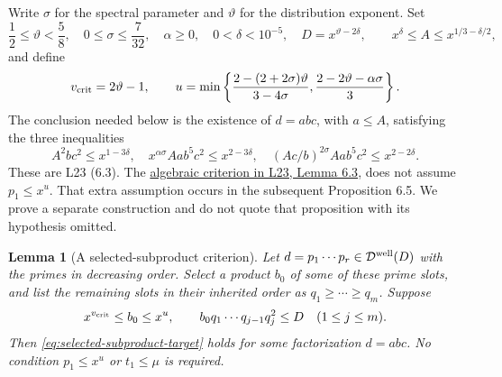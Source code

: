 \documentclass[11pt]{article}
\newtheorem{lemma}[theorem]{Lemma}
\begin{document}
Write $\sigma$ for the spectral parameter and $\vartheta$ for the
distribution exponent.  Set
\[
 \frac12\le\vartheta<\frac58,\quad 0\le\sigma\le\frac7{32},\quad
 \alpha\ge0,\quad 0<\delta<10^{-5},\quad D=x^{\vartheta-2\delta},
 \qquad x^\delta\le A\le x^{1/3-\delta/2},
\]
and define
\[
 v_{\rm crit}=2\vartheta-1,\qquad
 u=\min\left\{
 \frac{2-(2+2\sigma)\vartheta}{3-4\sigma},
 \frac{2-2\vartheta-\alpha\sigma}{3}\right\}.
\]
The conclusion needed below is the existence of $d=abc$, with $a\le A$,
satisfying the three inequalities
\begin{equation}\label{eq:selected-subproduct-target}
 A^2bc^2\le x^{1-3\delta},\quad
 x^{\alpha\sigma}Aab^5c^2\le x^{2-3\delta},\quad
 (Ac/b)^{2\sigma}Aab^5c^2\le x^{2-2\delta}.
\end{equation}
These are L23 (6.3).  The
\href{https://arxiv.org/html/2309.08522v1}
{algebraic criterion in L23, Lemma 6.3}, does not assume
$p_1\le x^u$.  That extra assumption occurs in the subsequent
Proposition 6.5.  We prove a separate construction and do not quote
that proposition with its hypothesis omitted.

\begin{lemma}[A selected-subproduct criterion]
\label{lem:selected-subproduct-factorization}
Let $d=p_1\cdots p_r\in\mathcal D^{\rm well}(D)$ with the primes
in decreasing order.  Select a product $b_0$ of some of these prime
slots, and list the remaining slots in their inherited order as
$q_1\ge\cdots\ge q_m$.  Suppose
\begin{equation}\label{eq:selected-subproduct-assumptions}
 x^{v_{\rm crit}}\le b_0\le x^u,
 \qquad b_0q_1\cdots q_{j-1}q_j^2\le D\quad(1\le j\le m).
\end{equation}
Then \eqref{eq:selected-subproduct-target} holds for some factorization
$d=abc$.  No condition $p_1\le x^u$ or $t_1\le\mu$ is required.
\end{lemma}
\end{document}
